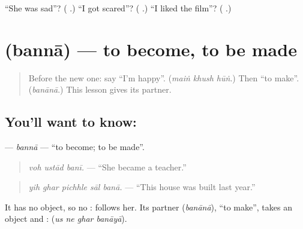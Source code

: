 \begin{tcolorbox}[breakable,colback=teal!4,colframe=teal!35!black,title={Before you move on}]
\textquotedblleft{}She was sad\textquotedblright{}? (\textbf{  }.) \textquotedblleft{}I got scared\textquotedblright{}? (\textbf{  }.) \textquotedblleft{}I liked the film\textquotedblright{}? (\textbf{   }.)
\end{tcolorbox}
\section[\texorpdfstring{\ur{بننا} (bannā)}{بننا (bannā)}]{ (bannā) — to become, to be made}

\label{lesson:UR-C272-banna}



\begin{quote}
Before the new one: say \textquotedblleft{}I'm happy\textquotedblright{}. (\emph{maiṅ khush hūṅ}.) Then \textquotedblleft{}to make\textquotedblright{}. (\emph{banānā}.) This lesson gives its partner.
\end{quote}

\subsection*{You'll want to know: }
\textbf{} — \emph{bannā} — \textquotedblleft{}to become; to be made\textquotedblright{}.

\begin{quote}
\textbf{  }
\end{quote}

\begin{quote}
\emph{voh ustād banī.} — \textquotedblleft{}She became a teacher.\textquotedblright{}
\end{quote}

\begin{quote}
\textbf{    }
\end{quote}

\begin{quote}
\emph{yih ghar pichhle sāl banā.} — \textquotedblleft{}This house was built last year.\textquotedblright{}
\end{quote}

It has no object, so no \textbf{}: \textbf{} follows her. Its partner \textbf{} (\emph{banānā}), \textquotedblleft{}to make\textquotedblright{}, takes an object and \textbf{}: \textbf{   } (\emph{us ne ghar banāyā}).

